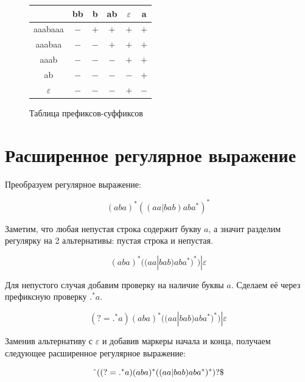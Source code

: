 \documentclass[a4paper, 12pt]{article}
\begin{document}
    \begin{figure}[H]
      \centering
      \begin{tabular}{|c|c|c|c|c|c|}
        \hline
        & bb & b & ab & $\varepsilon$ & a \\
        \hline
        aaabaaa & $-$ & $+$ & $+$ & $+$ & $+$ \\
        \hline
        aaabaa & $-$ & $-$ & $+$ & $+$ & $+$ \\
        \hline
        aaab & $-$ & $-$ & $-$ & $+$ & $+$ \\
        \hline
        ab & $-$ & $-$ & $-$ & $-$ & $+$\\
        \hline
        $\varepsilon$ & $-$ & $-$ & $-$ & $+$ & $-$\\
        \hline
      \end{tabular}
      \caption{Таблица префиксов-суффиксов}
      \label{table:afa-prefix-suffix}
    \end{figure}


    \section{Расширенное регулярное выражение}

    Преобразуем регулярное выражение:


    \[
      (aba)^{*}((aa | bab)aba^{*})^{*}
    \]

    Заметим, что любая непустая строка содержит букву $a$, а значит разделим регулярку на 2 альтернативы: пустая строка и непустая.

    \[
      (aba)^{*}((aa | bab)aba^{*})^{*})|\varepsilon
    \]

    Для непустого случая добавим проверку на наличие буквы $a$. Сделаем её через префиксную проверку $.^*a$.

    \[
      (?=.^*a)(aba)^{*}((aa | bab)aba^{*})^{*})|\varepsilon
    \]

    Заменив альтернативу с $\varepsilon$ и добавив маркеры начала и конца, получаем следующее расширенное регулярное выражение:

    \[
      \string^((?=.^*a)(aba)^{*}((aa | bab)aba^{*})^{*})?\$
    \]
\end{document}
